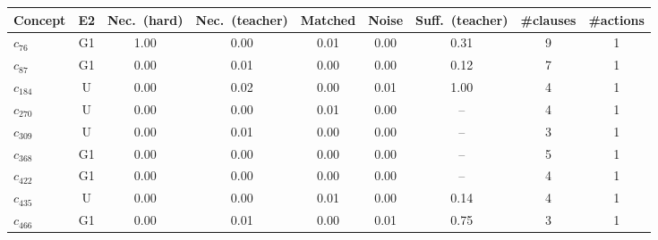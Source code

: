 \begin{tabular}{lcccccccc}
\toprule
Concept & E2 & Nec.\ (hard) & Nec.\ (teacher) & Matched & Noise & Suff.\ (teacher) & \#clauses & \#actions \\
\midrule
$c_{76}$ & G1 & 1.00 & 0.00 & 0.01 & 0.00 & 0.31 & 9 & 1 \\
$c_{87}$ & G1 & 0.00 & 0.01 & 0.00 & 0.00 & 0.12 & 7 & 1 \\
$c_{184}$ & U & 0.00 & 0.02 & 0.00 & 0.01 & 1.00 & 4 & 1 \\
$c_{270}$ & U & 0.00 & 0.00 & 0.01 & 0.00 & -- & 4 & 1 \\
$c_{309}$ & U & 0.00 & 0.01 & 0.00 & 0.00 & -- & 3 & 1 \\
$c_{368}$ & G1 & 0.00 & 0.00 & 0.00 & 0.00 & -- & 5 & 1 \\
$c_{422}$ & G1 & 0.00 & 0.00 & 0.00 & 0.00 & -- & 4 & 1 \\
$c_{435}$ & U & 0.00 & 0.00 & 0.01 & 0.00 & 0.14 & 4 & 1 \\
$c_{466}$ & G1 & 0.00 & 0.01 & 0.00 & 0.01 & 0.75 & 3 & 1 \\
\bottomrule
\end{tabular}